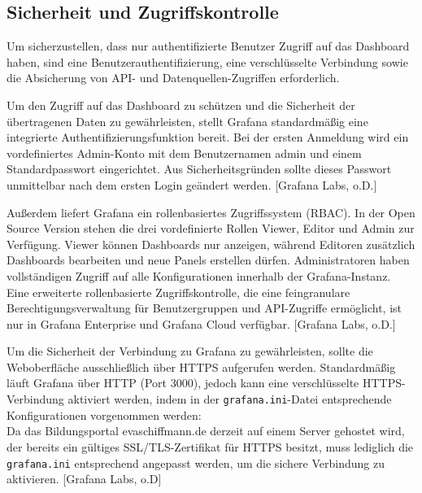 \subsection{Sicherheit und Zugriffskontrolle}
Um sicherzustellen, dass nur authentifizierte Benutzer Zugriff auf das Dashboard haben, sind eine Benutzerauthentifizierung, eine verschlüsselte Verbindung sowie die Absicherung von API- und Datenquellen-Zugriffen erforderlich.

Um den Zugriff auf das Dashboard zu schützen und die Sicherheit der übertragenen Daten zu gewährleisten, stellt Grafana standardmäßig eine integrierte Authentifizierungsfunktion bereit. Bei der ersten Anmeldung wird ein vordefiniertes Admin-Konto mit dem Benutzernamen admin und einem Standardpasswort eingerichtet. Aus Sicherheitsgründen sollte dieses Passwort unmittelbar nach dem ersten Login geändert werden. [Grafana Labs, o.D.]

Außerdem liefert Grafana ein rollenbasiertes Zugriffssystem (RBAC). In der Open Source Version stehen die drei vordefinierte Rollen Viewer, Editor und Admin zur Verfügung. Viewer können Dashboards nur anzeigen, während Editoren zusätzlich Dashboards bearbeiten und neue Panels erstellen dürfen. Administratoren haben vollständigen Zugriff auf alle Konfigurationen innerhalb der Grafana-Instanz. Eine erweiterte rollenbasierte Zugriffskontrolle, die eine feingranulare Berechtigungsverwaltung für Benutzergruppen und API-Zugriffe ermöglicht, ist nur in Grafana Enterprise und Grafana Cloud verfügbar. [Grafana Labs, o.D.]

Um die Sicherheit der Verbindung zu Grafana zu gewährleisten, sollte die Weboberfläche ausschließlich über HTTPS aufgerufen werden. Standardmäßig läuft Grafana über HTTP (Port 3000), jedoch kann eine verschlüsselte HTTPS-Verbindung aktiviert werden, indem in der \texttt{grafana.ini}-Datei entsprechende Konfigurationen vorgenommen werden: \\



Da das Bildungsportal evaschiffmann.de derzeit auf einem Server gehostet wird, der bereits ein gültiges SSL/TLS-Zertifikat für HTTPS besitzt, muss lediglich die \texttt{grafana.ini} entsprechend angepasst werden, um die sichere Verbindung zu aktivieren. [Grafana Labs, o.D]

